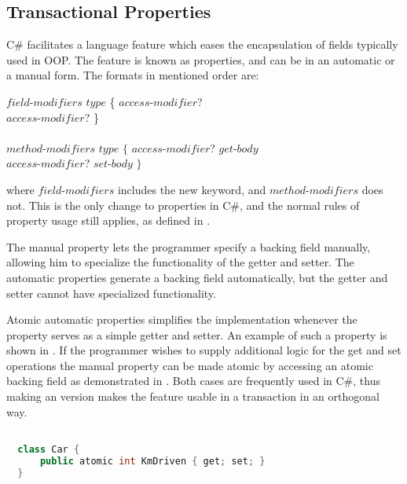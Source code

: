 \subsection{Transactional Properties}\label{subsec:design_properties}
C\# facilitates a language feature which eases the encapsulation of fields typically used in \ac{OOP}. The feature is known as properties, and can be in an automatic or a manual form. The formats in mentioned order are\cite[p. 52]{sestoft2011c}:

$field$-$modifiers$ $type$  \{ $access$-$modifier$? \bscode{;} \\ $access$-$modifier$? \bscode{;} \}
\\\\
$method$-$modifiers$ $type$  $\{$ $access$-$modifier$?  $get$-$body$ \\ $access$-$modifier$?  $set$-$body$ $\}$

where $field$-$modifiers$ includes the new  keyword, and $method$-$modifiers$ does not. This is the only change to properties in C\#, and the normal rules of property usage still applies, as defined in \cite[p. 52]{sestoft2011c}.

The manual property lets the programmer specify a backing field manually, allowing him to specialize the functionality of the getter and setter. The automatic properties generate a backing field automatically, but the getter and setter cannot have specialized functionality. 

Atomic automatic properties simplifies the implementation whenever the property serves as a simple getter and setter. An example of such a property is shown in . If the programmer wishes to supply additional logic for the get and set operations the manual property can be made atomic by accessing an atomic backing field as demonstrated in . Both cases are frequently used in C\#, thus making an  version makes the feature usable in a transaction in an orthogonal way.

\begin{lstlisting}[label=lst:auto_atomic_property,
  caption={Automatic Transactional Properties},
  language=Java,  
  showspaces=false,
  showtabs=false,
  breaklines=true,
  showstringspaces=false,
  breakatwhitespace=true,
  commentstyle=\color{greencomments},
  keywordstyle=\color{bluekeywords},
  stringstyle=\color{redstrings},
  morekeywords={atomic, retry, orElse, var, get, set}]  % Start your code-block

  class Car {
      public atomic int KmDriven { get; set; }
  }
\end{lstlisting}

